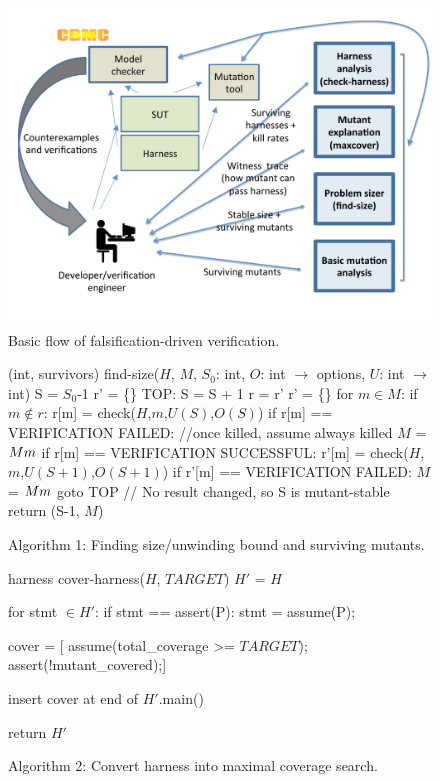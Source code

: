 \documentclass[conference]{IEEEtran}
\begin{document}
\begin{figure}
\includegraphics[width=\columnwidth]{TestFlow}
\caption{Basic flow of falsification-driven verification.}
\label{fig:flow}
\end{figure}

\begin{figure}
{\scriptsize 
\begin{code}
(int, survivors) find-size($H$, $M$, $S_0$: int,
                           $O$: int $\rightarrow$ options,
                           $U$: int $\rightarrow$ int) 
\vspace{0.1in}
S = $S_0$-1 
r' = \{\}
TOP:
S = S + 1 
r = r' 
r' = \{\}
for $m \in M$:
   if $m \not\in r$:
      r[m] = check($H$,$m$,$U(S)$,$O(S)$) 
      if r[m] == VERIFICATION FAILED:
         //once killed, assume always killed 
         $M$ = $M \\ m$
   if r[m] == VERIFICATION SUCCESSFUL:
      r'[m] = check($H$,$m$,$U(S+1)$,$O(S+1)$) 
      if r'[m] == VERIFICATION FAILED:
         $M$ = $M \\ m$
         goto TOP 
// No result changed, so S is mutant-stable 
return (S-1, $M$) 
\end{code}
}
\caption{Algorithm 1: Finding size/unwinding bound and surviving
  mutants.}
\label{alg:unwind}
\end{figure}

\begin{figure}
{\scriptsize 
\begin{code}
harness cover-harness($H$, $TARGET$) 
\vspace{0.1in}
$H'$ = $H$

for stmt $\in H'$:
   if stmt == assert(P):
      stmt = assume(P);

cover = [
  assume(total\_coverage >= $TARGET$); 
  assert(!mutant\_covered);]

insert cover at end of $H'$.main() 

return $H'$
\end{code}
}
\caption{Algorithm 2: Convert harness into maximal coverage search.}
\label{alg:invert}
\end{figure}
\end{document}
